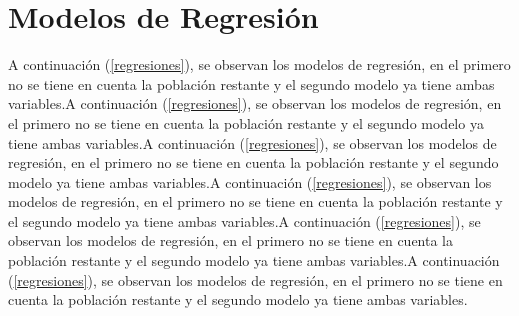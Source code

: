 \documentclass{article}
\begin{document}
\section{Modelos de Regresión}\label{ModReg}

A continuación (\ref{regresiones}), se observan los modelos de regresión, en el primero no se tiene en cuenta la población restante y el segundo modelo ya tiene ambas variables.A continuación (\ref{regresiones}), se observan los modelos de regresión, en el primero no se tiene en cuenta la población restante y el segundo modelo ya tiene ambas variables.A continuación (\ref{regresiones}), se observan los modelos de regresión, en el primero no se tiene en cuenta la población restante y el segundo modelo ya tiene ambas variables.A continuación (\ref{regresiones}), se observan los modelos de regresión, en el primero no se tiene en cuenta la población restante y el segundo modelo ya tiene ambas variables.A continuación (\ref{regresiones}), se observan los modelos de regresión, en el primero no se tiene en cuenta la población restante y el segundo modelo ya tiene ambas variables.A continuación (\ref{regresiones}), se observan los modelos de regresión, en el primero no se tiene en cuenta la población restante y el segundo modelo ya tiene ambas variables.
\end{document}
